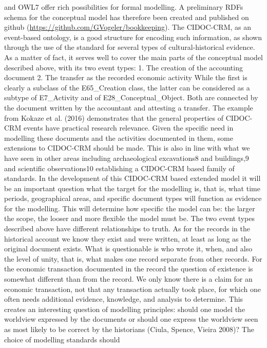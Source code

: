 \documentclass[12pt,a4paper]{article}
\begin{document}
and OWL7 offer rich possibilities for formal modelling. A preliminary RDFs schema for the
conceptual model has therefore been created and published on github
(\url{https://github.com/GVogeler/bookkeeping}).
The CIDOC-CRM, as an event-based ontology, is a good structure for encoding such
information, as shown through the use of the standard for several types of cultural-historical
evidence. As a matter of fact, it serves well to cover the main parts of the conceptual model
described above, with its two event types:
1. The creation of the accounting document
2. The transfer as the recorded economic activity
While the first is clearly a subclass of the E65\_Creation class, the latter can be considered as a
subtype of E7\_Activity and of E28\_Conceptual\_Object.
 Both are connected by the document
written by the accountant and attesting a transfer. The example from Kokaze et al. (2016)
demonstrates that the general properties of CIDOC-CRM events have practical research
relevance.
Given the specific need in modelling these documents and the activities documented in them,
some extensions to CIDOC-CRM should be made. This is also in line with what we have seen in
other areas including archaeological excavations8 and buildings,9 and scientific observations10
establishing a CIDOC-CRM based family of standards. In the development of this CIDOC-CRM
based extended model it will be an important question what the target for the modelling is, that
is, what time periods, geographical areas, and specific document types will function as evidence
for the modelling. This will determine how specific the model can be: the larger the scope, the
looser and more flexible the model must be.
The two event types described above have different relationships to truth. As for the records in
the historical account we know they exist and were written, at least as long as the original
document exists. What is questionable is who wrote it, when, and also the level of unity, that is,
what makes one record separate from other records. For the economic transaction documented in
the record the question of existence is somewhat different than from the record. We only know
there is a claim for an economic transaction, not that any transaction actually took place, for
which one often needs additional evidence, knowledge, and analysis to determine.
This creates an interesting question of modelling principles: should one model the worldview
expressed by the documents or should one express the worldview seen as most likely to be
correct by the historians (Ciula, Spence, Vieira 2008)? The choice of modelling standards should
\end{document}
